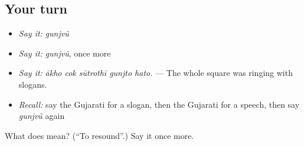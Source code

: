 \subsection*{Your turn}
\begin{itemize}
\raggedright
  \item \emph{Say it:} \emph{gunjvũ}
  \item \emph{Say it:} \emph{gunjvũ}, once more
  \item \emph{Say it:} \emph{ākho cok sūtrothī gunjto hato.} — The whole square was ringing with slogans.
  \item \emph{Recall:} say the Gujarati for a slogan, then the Gujarati for a speech, then say \emph{gunjvũ} again
\end{itemize}

\begin{tcolorbox}[breakable,colback=teal!4,colframe=teal!35!black,title={Before you move on}]
What does  mean? (\textquotedblleft{}To resound\textquotedblright{}.) Say it once more.
\end{tcolorbox}
